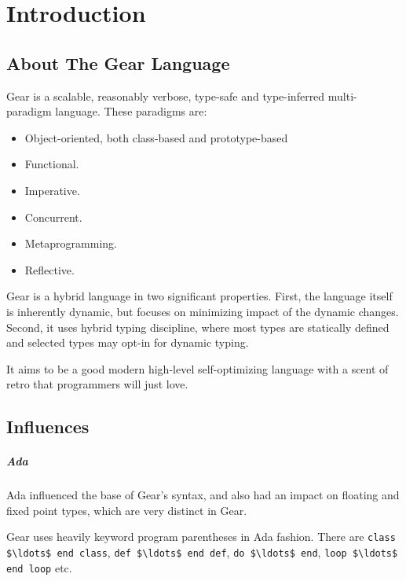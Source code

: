 
\chapter{Introduction}

\minitoc

\newpage


\section{About The Gear Language}

Gear is a scalable, reasonably verbose, type-safe and type-inferred multi-paradigm language. These paradigms are:
\begin{itemize}
  \item Object-oriented, both class-based and prototype-based
  \item Functional. 
  \item Imperative. 
  \item Concurrent. 
  \item Metaprogramming. 
  \item Reflective. 
\end{itemize}

Gear is a hybrid language in two significant properties. First, the language itself is inherently dynamic, but focuses on minimizing impact of the dynamic changes. Second, it uses hybrid typing discipline, where most types are statically defined and selected types may opt-in for dynamic typing. 

It aims to be a good modern high-level self-optimizing language with a scent of retro that programmers will just love. 






\section{Influences}

\paragraph{Ada}
Ada influenced the base of Gear's syntax, and also had an impact on floating and fixed point types, which are very distinct in Gear. 

Gear uses heavily keyword program parentheses in Ada fashion. There are \lstinline!class $\ldots$ end class!, \lstinline!def $\ldots$ end def!, \lstinline!do $\ldots$ end!, \lstinline!loop $\ldots$ end loop! etc.

